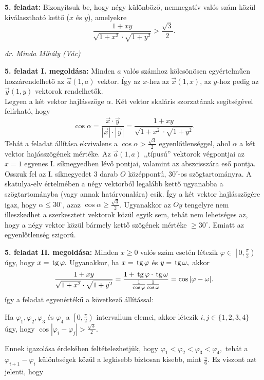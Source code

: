 \documentclass[a4paper,10pt]{article}
\def\ki#1#2{\hfill {\it #1 (#2)}\medskip}
\def\tg{\, \hbox{tg} \,}
\begin{document}
{\bf 5. feladat: } Bizonyítsuk be, hogy négy különböző, nemnegatív valós szám közül
kiválasztható  kettő ($x$ és $y$), amelyekre
$$\frac{1+xy}{\sqrt{1+x^2}\cdot\sqrt{1+y^2}}>\frac{\sqrt{3}}{2}.$$

\ki{dr. Minda Mihály}{Vác}\medskip

\textbf{5. feladat I. megoldása: } Minden $a$ valós számhoz kölcsönösen egyértel\-mű\-en
hozzárendelhető az $\overrightarrow{a}(1,a)$ vektor. Így az $x$-hez az $\overrightarrow{x}(1,x)$, az $y$-hoz pedig az $\overrightarrow{y}(1,y)$ vektorok rendelhetők.\\
Legyen a két vektor hajlásszöge $\alpha$. Két vektor skaláris
szorzatának segítségével felírható, hogy
$$\cos{\alpha}=\frac{\overrightarrow{x}\cdot\overrightarrow{y}}{|\overrightarrow{x}|\cdot|\overrightarrow{y}|}=
\frac{1+xy}{\sqrt{1+x^2}\cdot\sqrt{1+y^2}}.$$ Tehát a feladat
állítása ekvivalens a $\cos\alpha> \frac{\sqrt{3}}{2}$
egyenlőtlenséggel, ahol $\alpha$ a két vektor hajásszögének
mértéke. Az $\overrightarrow{a}(1,a)$ ,,típusú'' vektorok
végpontjai az $x=1$ egyenes I. sík\-ne\-gyedben lévő pontjai,
valamint az abszcisszára eső pontja. Osszuk fel az I. síknegyedet 3
darab $O$ középpontú, $30^\circ$-os szögtartományra. A skatulya-elv
értelmében a négy vektorból legalább kettő ugyanabba a
szögtartományba (vagy annak határvonalára) esik. Így a két vektor
hajlásszögére igaz, hogy $\alpha\leq 30^\circ$, azaz
$\cos\alpha\geq\frac{\sqrt{3}}{2}$. Ugyanakkor az $Oy$ tengelyre nem
illeszkedhet a szerkesztett vektorok közül egyik sem, tehát
nem lehetséges az, hogy a négy vektor közül bármely kett\H
o szögének mértéke $\geq 30^{\circ}.$ Emiatt az egyenl\H
otlenség szigorú.

\medskip


\textbf{5. feladat II. megoldása: } Minden $x\geq 0$ valós szám
esetén létezik $\varphi\in \left [0,\frac{\pi}{2}\right)$ úgy,
hogy $x=\tg \varphi.$ Ugyanakkor, ha $x=\tg \varphi$ és $y=\tg
\omega,$ akkor
$$\frac{1+xy}{\sqrt{1+x^2}\cdot\sqrt{1+y^2}}=\frac{1+\tg \varphi \cdot \tg \omega}{\frac{1}{\cos \varphi}\frac{1}{\cos \omega}}=\cos|\varphi-\omega|.$$
így a feladat egyenértékű a következő
állítással:

Ha $\varphi_1,\varphi_2,\varphi_3$ és $\varphi_4$ a $\left
[0,\frac{\pi}{2} \right )$ intervallum elemei, akkor létezik
$i,j\in \{1,2,3,4\}$ úgy, hogy
$\cos|\varphi_i-\varphi_j|>\frac{\sqrt{3}}{2}.$

Ennek igazolása érdekében feltételezhetjük, hogy
$\varphi_1<\varphi_2<\varphi_3<\varphi_4,$ tehát a
$\varphi_{i+1}-\varphi_i$ különbségek közül a legkisebb
biztosan kisebb, mint $\frac{\pi}{6}.$ Ez viszont azt jelenti, hogy
\end{document}

